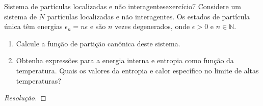 \begin{exercício}{Sistema de partículas localizadas e não interagentes}{exercício7}
    Considere um sistema de \(N\) partículas localizadas e não interagentes. Os estados de partícula única têm energias \(\epsilon_n = n \epsilon\) e são \(n\) vezes degenerados, onde \(\epsilon > 0\) e \(n \in \mathbb{N}\).
    \begin{enumerate}[label=(\alph*)]
        \item Calcule a função de partição canônica deste sistema.
        \item Obtenha expressões para a energia interna e entropia como função da temperatura. Quais os valores da entropia e calor específico no limite de altas temperaturas?
    \end{enumerate}
\end{exercício}
\begin{proof}[Resolução]

\end{proof}
